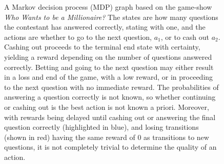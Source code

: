 \begin{figure}
    \vspace{1cm}

    \caption[
        Example of a Markov decision process (MDP) graph.
    ]
    {
        A Markov decision process (MDP) graph based on the game-show \textit{Who Wants to be a Millionaire?}
        The states are how many questions the contestant has answered correctly, stating with one, and the actions are whether to go to the next question, $a_1$, or to cash out $a_2$.
        Cashing out proceeds to the terminal end state with certainty, yielding a reward depending on the number of questions answered correctly.
        Betting and going to the next question may either result in a loss and end of the game, with a low reward, or in proceeding to the next question with no immediate reward.
        The probabilities of answering a question correctly is not known, so whether continuing or cashing out is the best action is not known a priori.
        Moreover, with rewards being delayed until cashing out or answering the final question correctly (highlighted in blue), and losing transitions (shown in red) having the same reward of 0 as transitions to new questions, it is not completely trivial to determine the quality of an action.
    }
    \label{fig:mdp}
\end{figure}


